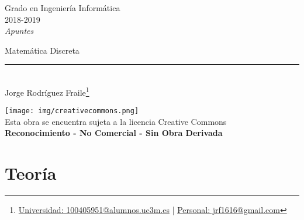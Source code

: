 \documentclass[12pt, twoside, openright]{report} %
\begin{document}
	
\begin{titlepage}
	\begin{sffamily}
	\color{azulUC3M}
	\begin{center}
		\begin{figure}[H] %
		\end{figure}
		\vspace{2.5cm}
		\begin{Large}
			Grado en Ingeniería Informática\\			
			2018-2019\\
			\vspace{2cm}		
			\textsl{Apuntes}\\
			\bigskip
		\end{Large}
		 	{\Huge Matemática Discreta}\\
		 	\vspace*{0.5cm}
	 		\rule{10.5cm}{0.1mm}\\
			\vspace*{0.9cm}
			{\LARGE Jorge Rodríguez Fraile\footnote{\href{mailto:100405951@alumnos.uc3m.es}{Universidad: 100405951@alumnos.uc3m.es}  |  \href{mailto:jrf1616@gmail.com}{Personal: jrf1616@gmail.com}}}\\ 
			\vspace*{1cm}
	\end{center}
	\vfill
	\color{black}
		\texttt{[image: img/creativecommons.png]}\\
		Esta obra se encuentra sujeta a la licencia Creative Commons\\ \textbf{Reconocimiento - No Comercial - Sin Obra Derivada}
	\end{sffamily}
\end{titlepage}


\tableofcontents
\thispagestyle{fancy}






\part{Teoría}

\end{document}
